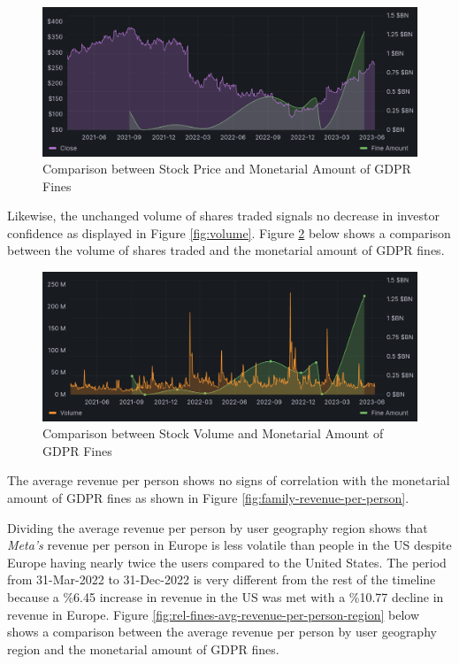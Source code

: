 \documentclass[12pt, a4paper]{article}
\begin{document}
\begin{figure}[H]
    \centering
    \includegraphics[width=1.00\textwidth]{rel-fines-stock-price}
    \caption{Comparison between Stock Price and Monetarial Amount of GDPR Fines}
    \label{fig:rel-stock-price}
\end{figure}

Likewise, the unchanged volume of shares traded signals no decrease in investor
confidence as displayed in Figure \ref{fig:volume}. Figure
\ref{fig:rel-fines-volume} below shows a comparison between the volume of shares
traded and the monetarial amount of GDPR fines.

\begin{figure}[H]
    \centering
    \includegraphics[width=1.00\textwidth]{rel-fines-volume}
    \caption{Comparison between Stock Volume and Monetarial Amount of GDPR Fines}
    \label{fig:rel-fines-volume}
\end{figure}

The average revenue per person shows no signs of correlation with the monetarial
amount of GDPR fines as shown in Figure \ref{fig:family-revenue-per-person}.

Dividing the average revenue per person by user geography region shows that
\textit{Meta's} revenue per person in Europe is less volatile than people in the
US despite Europe having nearly twice the users compared to the United
States\cite{2023q1}. The period from 31-Mar-2022 to 31-Dec-2022 is very
different from the rest of the timeline because a \%6.45 increase in revenue in
the US was met with a \%10.77 decline in revenue in Europe. Figure
\ref{fig:rel-fines-avg-revenue-per-person-region} below shows a comparison
between the average revenue per person by user geography region and the
monetarial amount of GDPR fines.
\end{document}
